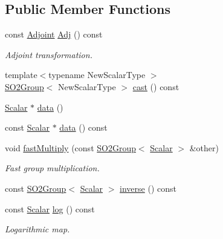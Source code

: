 \subsection*{Public Member Functions}
\begin{DoxyCompactItemize}
\item 
const \hyperlink{class_sophus_1_1_s_o2_group_base_a02b4843e52df827cf466eacd288697fa}{Adjoint} \hyperlink{class_sophus_1_1_s_o2_group_base_ada6ac17d59649f2c64ca5582c5e51d92}{Adj} () const 
\begin{DoxyCompactList}\small\item\em Adjoint transformation. \end{DoxyCompactList}\item 
{\footnotesize template$<$typename New\+Scalar\+Type $>$ }\\\hyperlink{class_sophus_1_1_s_o2_group}{S\+O2\+Group}$<$ New\+Scalar\+Type $>$ \hyperlink{class_sophus_1_1_s_o2_group_base_aa874d8841828cf62efd7e7c4a4f3b14b}{cast} () const 
\item 
\hyperlink{class_sophus_1_1_s_o2_group_base_a075b701502715aecf0bdb3464963d36c}{Scalar} $\ast$ \hyperlink{class_sophus_1_1_s_o2_group_base_ae9446146654e17b23bd9e0ec497461fb}{data} ()
\item 
const \hyperlink{class_sophus_1_1_s_o2_group_base_a075b701502715aecf0bdb3464963d36c}{Scalar} $\ast$ \hyperlink{class_sophus_1_1_s_o2_group_base_a2a86a713d9c6bce6aa285ec57d050249}{data} () const 
\item 
void \hyperlink{class_sophus_1_1_s_o2_group_base_ad00a8f66f8fc0814f395d92dcfb9943c}{fast\+Multiply} (const \hyperlink{class_sophus_1_1_s_o2_group}{S\+O2\+Group}$<$ \hyperlink{class_sophus_1_1_s_o2_group_base_a075b701502715aecf0bdb3464963d36c}{Scalar} $>$ \&other)
\begin{DoxyCompactList}\small\item\em Fast group multiplication. \end{DoxyCompactList}\item 
const \hyperlink{class_sophus_1_1_s_o2_group}{S\+O2\+Group}$<$ \hyperlink{class_sophus_1_1_s_o2_group_base_a075b701502715aecf0bdb3464963d36c}{Scalar} $>$ \hyperlink{class_sophus_1_1_s_o2_group_base_aa839d14832740111e954009345c9249b}{inverse} () const 
\item 
const \hyperlink{class_sophus_1_1_s_o2_group_base_a075b701502715aecf0bdb3464963d36c}{Scalar} \hyperlink{class_sophus_1_1_s_o2_group_base_a4663dc1acc7566b066125c900dc4beb1}{log} () const 
\begin{DoxyCompactList}\small\item\em Logarithmic map. \end{DoxyCompactList}\item 

\end{DoxyCompactItemize}
